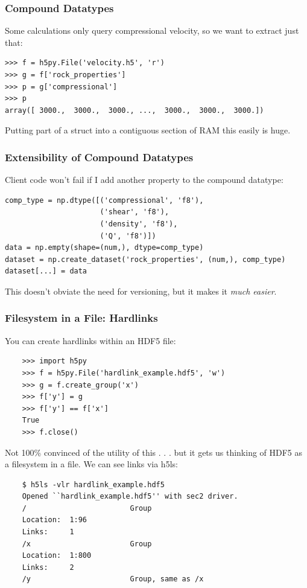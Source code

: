 \documentclass[9pt]{beamer}
\begin{document}
\begin{frame}[fragile]
\frametitle{Compound Datatypes}
Some calculations only query compressional velocity, so we want to extract just that:
\begin{verbatim}
>>> f = h5py.File('velocity.h5', 'r')
>>> g = f['rock_properties']
>>> p = g['compressional']
>>> p
array([ 3000.,  3000.,  3000., ...,  3000.,  3000.,  3000.])
\end{verbatim}
Putting part of a struct into a contiguous section of RAM this easily is huge.
\end{frame}

\begin{frame}[fragile]
\frametitle{Extensibility of Compound Datatypes}
Client code won't fail if I add another property to the compound datatype:
\begin{verbatim}
comp_type = np.dtype([('compressional', 'f8'),
                      ('shear', 'f8'),
                      ('density', 'f8'),
                      ('Q', 'f8')])
data = np.empty(shape=(num,), dtype=comp_type) 
dataset = np.create_dataset('rock_properties', (num,), comp_type)
dataset[...] = data
\end{verbatim}
This doesn't obviate the need for versioning, but it makes it \emph{much easier}.
\end{frame}


\begin{frame}[fragile]
  \frametitle{Filesystem in a File: Hardlinks}
  You can create hardlinks within an HDF5 file:
  \begin{verbatim}
    >>> import h5py
    >>> f = h5py.File('hardlink_example.hdf5', 'w')
    >>> g = f.create_group('x')
    >>> f['y'] = g
    >>> f['y'] == f['x']
    True
    >>> f.close()
  \end{verbatim}
  Not 100\% convinced of the utility of this . . . but it gets us thinking of HDF5 as a filesystem in a file. We can see links via h5ls:
  \begin{verbatim}
    $ h5ls -vlr hardlink_example.hdf5
    Opened ``hardlink_example.hdf5'' with sec2 driver.
    /                        Group
    Location:  1:96
    Links:     1
    /x                       Group
    Location:  1:800
    Links:     2
    /y                       Group, same as /x
  \end{verbatim}
\end{frame}
\end{document}
